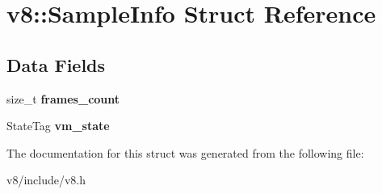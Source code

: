 \hypertarget{structv8_1_1SampleInfo}{}\section{v8\+:\+:Sample\+Info Struct Reference}
\label{structv8_1_1SampleInfo}
\subsection*{Data Fields}
\begin{DoxyCompactItemize}
\item 
size\+\_\+t {\bfseries frames\+\_\+count}\hypertarget{structv8_1_1SampleInfo_a5f1e51bc358605e0c1d38fb2f3d344cd}{}\label{structv8_1_1SampleInfo_a5f1e51bc358605e0c1d38fb2f3d344cd}

\item 
State\+Tag {\bfseries vm\+\_\+state}\hypertarget{structv8_1_1SampleInfo_afd6198c9feb44a8df79576cf427b9a91}{}\label{structv8_1_1SampleInfo_afd6198c9feb44a8df79576cf427b9a91}

\end{DoxyCompactItemize}


The documentation for this struct was generated from the following file\+:\begin{DoxyCompactItemize}
\item 
v8/include/v8.\+h\end{DoxyCompactItemize}
